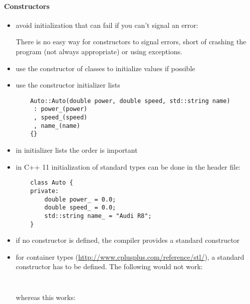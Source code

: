 \paragraph{Constructors}
\begin{itemize}

	\item avoid initialization that can fail if you can't signal an error:
	
	There is no easy way for constructors to signal errors, short of crashing the program (not always appropriate) or using exceptions.
	\item use the constructor of classes to initialize values if possible
	\item use the constructor initializer lists
	\begin{verbatim}
	Auto::Auto(double power, double speed, std::string name)
	 : power_(power)
	 , speed_(speed)
	 , name_(name)
	{}
	\end{verbatim}
	
	\item in initializer lists the order is important
	\item in C++ 11 initialization of standard types can be done in the header file:
	\begin{verbatim}
	class Auto {
	private:
		double power_ = 0.0;
		double speed_ = 0.0;
		std::string name_ = "Audi R8";
	}
	\end{verbatim}
	
	\item if no constructor is defined, the compiler provides a standard constructor
	\item for container types (\url{http://www.cplusplus.com/reference/stl/}), a standard constructor has to be defined. The following would not work:
	
	\begin{minipage}[t]{0.4\textwidth}
		\inputminted{cpp}{src/constructors/ex-1/ConstructorClassFail.h}
	\end{minipage}\hfill
	\begin{minipage}[t]{0.4\textwidth}
		\inputminted{cpp}{src/constructors/ex-1/main-fail.cpp}		
	\end{minipage}
	
	whereas this works:
	
	\begin{minipage}[t]{0.4\textwidth}
		\inputminted{cpp}{src/constructors/ex-1/ConstructorClass.h}
	\end{minipage}\hfill
	\begin{minipage}[t]{0.4\textwidth}
		\inputminted{cpp}{src/constructors/ex-1/main.cpp}		
	\end{minipage}


\end{itemize}
